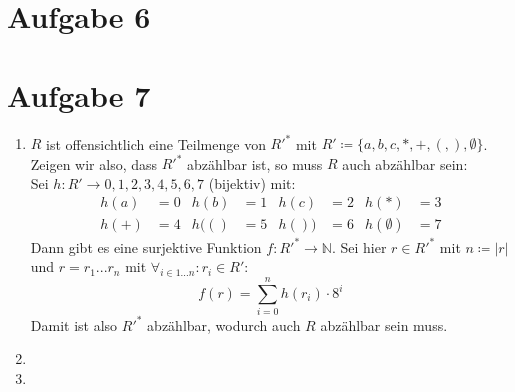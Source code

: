\documentclass[a4paper,11pt]{scrartcl}
\begin{document}
	\newpage
	
	\section*{Aufgabe 6}
	
	\newpage
	
	\section*{Aufgabe 7}
	\begin{enumerate}[label=\alph*)]
	\item 	$R$ ist offensichtlich eine Teilmenge von ${R'}^*$ mit $R' \coloneqq \{a,b,c,*,+,(,),\emptyset \}$.\\
			Zeigen wir also, dass ${R'}^*$ abzählbar ist, so muss $R$ auch abzählbar sein:\\
			Sei $h:R'\rightarrow {0,1,2,3,4,5,6,7}$ (bijektiv) mit:
			\begin{align*}
			h(a) &= 0		&	h(b) &= 1		&	h(c) &= 2		&	h(*) &= 3	\\
			h(+) &= 4		&	h(() &= 5		&	h()) &= 6		&	h(\emptyset ) &= 7
			\end{align*}
			Dann gibt es eine surjektive Funktion $f:{R'}^* \rightarrow \mathbb{N}$. Sei hier $r \in {R'}^*$ mit $n \coloneqq \vert r \vert$ und $r = r_1 ... r_n$ mit ${\forall}_{i\in 1...n}: r_i \in R'$: \\
			\[f(r) = \sum_{i=0}^{n} h(r_i) \cdot 8^i\]
			Damit ist also ${R'}^*$ abzählbar, wodurch auch $R$ abzählbar sein muss.
			
	\item	
	\item	
	\end{enumerate}
\end{document}
